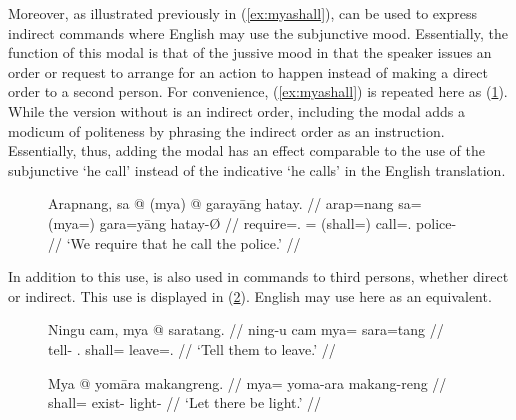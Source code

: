 Moreover, as illustrated previously in (\ref{ex:myashall}),  can be used to express indirect commands where English may
use the subjunctive mood. Essentially, the function of this modal is that of
the jussive mood in that the speaker issues an order or request to arrange for
an action to happen instead of making a direct order to a second person. For
convenience, (\ref{ex:myashall}) is repeated here as (\ref{ex:myashall_2}).
While the version without  is an indirect order, including the
modal adds a modicum of politeness by phrasing the indirect order as an
instruction. Essentially, thus, adding the modal has an effect comparable to
the use of the subjunctive `he call' instead of the indicative `he calls' in
the English translation.

\begin{figure}[h]
\ex\label{ex:myashall_2}\begingl
	\gla Arapnang, sa @ \textup{(}mya\textup{)} @ garayāng hatay. //
	\glb arap=nang sa= (mya=) gara=yāng hatay-Ø //
	\glc require=\Fpl{}.\Aarg{} \PatT{}= (shall=) call=\TsgM{}.\Aarg{}
	police-\Top{} //
	\glft `We require that he call the police.' //
\endgl\xe
\end{figure}

In addition to this use,  is also used in commands to third
persons, whether direct or indirect. This use is displayed in
(\ref{ex:indirimp}). English may use  here as an equivalent.

\begin{figure}[h]
\pex\label{ex:indirimp}
\a\begingl
	\gla Ningu cam, mya @ saratang. //
	\glb ning-u cam mya= sara=tang //
	\glc tell-\Imp{} \TplM{}.\Dat{} shall= leave=\TplM{}.\Aarg{} //
	\glft `Tell them to leave.' //
\endgl


\a\begingl
	\gla Mya @ yomāra makangreng. //
	\glb mya= yoma-ara makang-reng //
	\glc shall= exist-\TsgI{} light-\AargI{} //
	\glft `Let there be light.' //
\endgl
\xe
\end{figure}


